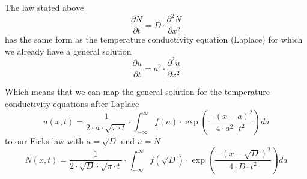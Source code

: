 The law stated above
\begin{equation}
\frac{\partial N}{\partial t} = D \cdot \frac{\partial^2 N}{\partial x^2} 
\end{equation}
has the same form as the temperature conductivity equation (Laplace) for which we already have a general solution
\begin{equation}
\frac{\partial u}{\partial t} = a^2 \cdot \frac{\partial^2 u}{\partial x^2} 
\end{equation}

Which means that we can map the general solution for the temperature conductivity equations after Laplace
\begin{equation}
u(x,t) = \frac{1}{2 \cdot a \cdot \sqrt{\pi \cdot t}} \cdot \int_{-\infty}^{\infty}{f(a)\cdot\exp\left(\frac{-(x-a)^2}{4 \cdot a^2 \cdot t^2}\right)}da
\end{equation}
to our Ficks law with $a=\sqrt{D}$ und $u=N$
\begin{equation}
N(x,t) = \frac{1}{2 \cdot \sqrt{D} \cdot \sqrt{\pi \cdot t}} \cdot \int_{-\infty}^{\infty}{f(\sqrt{D})\cdot\exp\left(\frac{-(x-\sqrt{D})^2}{4 \cdot D \cdot t^2}\right)}da
\end{equation}
